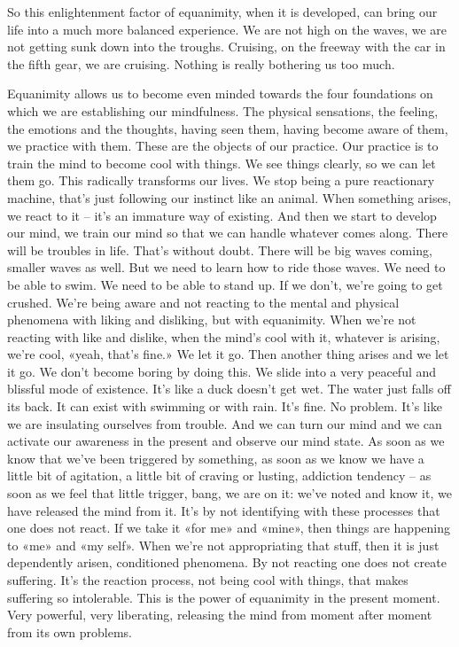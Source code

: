 \documentclass[letterpaper,10pt,english]{sphinxmanual}
\begin{document}
\sphinxAtStartPar
So this enlightenment factor of equanimity, when it is developed, can
bring our life into a much more balanced experience. We are not high on the
waves, we are not getting sunk down into the troughs. Cruising, on the freeway with the car in the fifth gear, we are cruising. Nothing is really bothering
us too much.

\sphinxAtStartPar
Equanimity allows us to become even minded towards the four foundations on which we are establishing our mindfulness. The physical sensations, the feeling, the emotions and the thoughts, having seen them, having
become aware of them, we practice with them. These are the objects of our
practice. Our practice is to train the mind to become cool with things. We see
things clearly, so we can let them go. This radically transforms our lives. We
stop being a pure reactionary machine, that’s just following our instinct like
an animal. When something arises, we react to it – it’s an immature way of
existing. And then we start to develop our mind, we train our mind so that we
can handle whatever comes along. There will be troubles in life. That’s without doubt. There will be big waves coming, smaller waves as well. But we
need to learn how to ride those waves. We need to be able to swim. We need
to be able to stand up. If we don’t, we’re going to get crushed. We’re being
aware  and  not  reacting  to  the  mental  and  physical  phenomena  with  liking
and disliking, but with equanimity. When we’re not reacting with like and
dislike, when the mind’s cool with it, whatever is arising, we’re cool, «yeah,
that’s fine.» We let it go. Then another thing arises and we let it go. We don’t
become boring by doing this. We slide into a very peaceful and blissful mode
  of existence. It’s like a duck doesn’t get wet. The water just falls off its back.
It can exist with swimming or with rain. It’s fine. No problem. It’s like we
are insulating ourselves from trouble. And we can turn our mind and we can
activate our awareness in the present and observe our mind state. As soon as
we know that we’ve been triggered by something, as soon as we know we
have a little bit of agitation, a little bit of craving or lusting, addiction tendency – as soon as we feel that little trigger, bang, we are on it: we’ve noted
and know it, we have released the mind from it. It’s by not identifying with
these processes that one does not react. If we take it «for me» and «mine»,
then things are happening to «me» and «my self». When we’re not appropriating that stuff, then it is just dependently arisen, conditioned phenomena.
By not reacting one does not create suffering. It’s the reaction process, not
being cool with things, that makes suffering so intolerable. This is the power
of equanimity in the present moment. Very powerful, very liberating, releasing the mind from moment after moment from its own problems.
\end{document}

